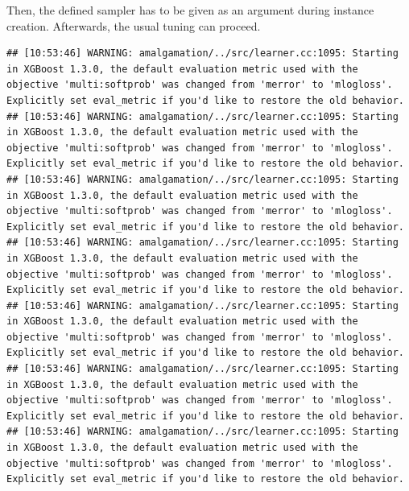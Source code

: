 \documentclass[
]{scrbook}
\newenvironment{Shaded}{\begin{snugshade}}{\end{snugshade}}
\newcommand{\AttributeTok}[1]{\textcolor[rgb]{0.77,0.63,0.00}{#1}}
\newcommand{\DecValTok}[1]{\textcolor[rgb]{0.00,0.00,0.81}{#1}}
\newcommand{\FunctionTok}[1]{\textcolor[rgb]{0.00,0.00,0.00}{#1}}
\newcommand{\NormalTok}[1]{#1}
\newcommand{\OtherTok}[1]{\textcolor[rgb]{0.56,0.35,0.01}{#1}}
\newcommand{\SpecialCharTok}[1]{\textcolor[rgb]{0.00,0.00,0.00}{#1}}
\newcommand{\StringTok}[1]{\textcolor[rgb]{0.31,0.60,0.02}{#1}}
\renewenvironment{Shaded} {\begin{snugshade}\small} {\end{snugshade}}
\begin{document}
Then, the defined sampler has to be given as an argument during instance creation.
Afterwards, the usual tuning can proceed.

\begin{Shaded}
\end{Shaded}

\begin{verbatim}
## [10:53:46] WARNING: amalgamation/../src/learner.cc:1095: Starting in XGBoost 1.3.0, the default evaluation metric used with the objective 'multi:softprob' was changed from 'merror' to 'mlogloss'. Explicitly set eval_metric if you'd like to restore the old behavior.
## [10:53:46] WARNING: amalgamation/../src/learner.cc:1095: Starting in XGBoost 1.3.0, the default evaluation metric used with the objective 'multi:softprob' was changed from 'merror' to 'mlogloss'. Explicitly set eval_metric if you'd like to restore the old behavior.
## [10:53:46] WARNING: amalgamation/../src/learner.cc:1095: Starting in XGBoost 1.3.0, the default evaluation metric used with the objective 'multi:softprob' was changed from 'merror' to 'mlogloss'. Explicitly set eval_metric if you'd like to restore the old behavior.
## [10:53:46] WARNING: amalgamation/../src/learner.cc:1095: Starting in XGBoost 1.3.0, the default evaluation metric used with the objective 'multi:softprob' was changed from 'merror' to 'mlogloss'. Explicitly set eval_metric if you'd like to restore the old behavior.
## [10:53:46] WARNING: amalgamation/../src/learner.cc:1095: Starting in XGBoost 1.3.0, the default evaluation metric used with the objective 'multi:softprob' was changed from 'merror' to 'mlogloss'. Explicitly set eval_metric if you'd like to restore the old behavior.
## [10:53:46] WARNING: amalgamation/../src/learner.cc:1095: Starting in XGBoost 1.3.0, the default evaluation metric used with the objective 'multi:softprob' was changed from 'merror' to 'mlogloss'. Explicitly set eval_metric if you'd like to restore the old behavior.
## [10:53:46] WARNING: amalgamation/../src/learner.cc:1095: Starting in XGBoost 1.3.0, the default evaluation metric used with the objective 'multi:softprob' was changed from 'merror' to 'mlogloss'. Explicitly set eval_metric if you'd like to restore the old behavior.

\end{verbatim}
\end{document}

